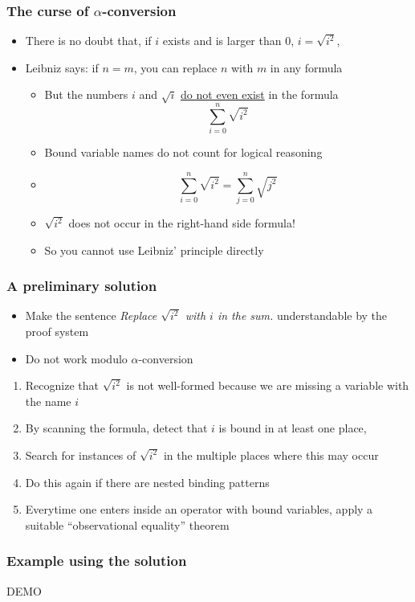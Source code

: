 \documentclass[compress]{beamer}
\begin{document}
\begin{frame}
\frametitle{The curse of \(\alpha\)-conversion}
\begin{itemize}
\item There is no doubt that, if \(i\) exists and is larger than 0,
\(i = \sqrt{i^2}\),
\item Leibniz says: if \(n = m\), you can replace \(n\) with \(m\) in
any formula
\begin{itemize}
\item But the numbers \(i\) and \(\sqrt{i}\) \underline{do not even exist}
in the formula
\[\sum_{i = 0}^{n} \sqrt{i^2}\]
\item Bound variable names do not count for logical reasoning
\item \[\sum_{i = 0}^{n} {\sqrt{i^2}} = 
\sum_{j = 0}^{n} {\sqrt{j^2}}\]
\item \(\sqrt{i ^ 2}\) does not occur in the right-hand side formula!
\item So you cannot use Leibniz' principle directly
\end{itemize}
\end{itemize}
\end{frame}
\begin{frame}
\frametitle{A preliminary solution}
\begin{itemize}
\item Make the sentence {\em Replace \(\sqrt{i^2}\) with \(i\) in the sum.}
understandable by the proof system
\item Do not work modulo \(\alpha\)-conversion
\end{itemize}
\begin{enumerate}
\item Recognize that \(\sqrt{i^2}\) is not well-formed because we are missing
a variable with the name \(i\)
\item By scanning the formula, detect that \(i\) is bound in at least one place,
\item Search for instances of \(\sqrt{i^2}\) in the multiple places where
this may occur
\item Do this again if there are nested binding patterns
\item Everytime one enters inside an operator with bound variables, apply
a suitable ``observational equality'' theorem
\end{enumerate}
\end{frame}
\begin{frame}
\frametitle{Example using the solution}

\begin{center}
\Huge DEMO
\end{center}
\end{frame}
\end{document}
